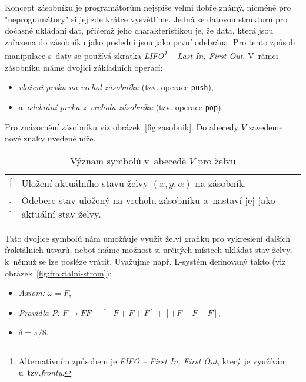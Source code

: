 Koncept zásobníku je programátorům nejspíše velmi dobře známý, nicméně pro "neprogramátory" si jej zde krátce vysvětlíme. Jedná se datovou strukturu pro dočasné ukládání dat, přičemž jeho charakteristikou je, že data, která jsou zařazena do zásobníku jako poslední jsou jako první odebrána. Pro tento způsob manipulace s~daty se používá zkratka \emph{LIFO\footnote{Alternativním způsobem je \emph{FIFO -- First In, First Out}, který je využíván u~tzv.\emph{fronty}.} -- Last In, First Out}. V~rámci zásobníku máme dvojici základních operací:
\begin{itemize}
    \item \emph{vložení prvku na vrchol zásobníku} (tzv. operace \texttt{push}),~
    \item a~\emph{odebrání prvku z~vrcholu zásobníku} (tzv. operace \texttt{pop}).
\end{itemize}
Pro znázornění zásobníku viz obrázek~\ref{fig:zasobnik}. Do abecedy $V$ zavedeme nové znaky uvedené níže. 
\begin{table}[H]
    \centering
    \begin{tabular}{lp{}}
        $[$ & Uložení aktuálního stavu želvy $(x,y,\alpha)$ na zásobník.\\
        $]$ & Odebere stav uložený na vrcholu zásobníku a~nastaví jej jako aktuální stav želvy.
    \end{tabular}
    \caption{Význam symbolů v~abecedě $V$ pro želvu}
    \label{table:vyznam-symbolu-zelva-zasobnik}
\end{table}
Tato dvojice symbolů nám umožňuje využít želví grafiku pro vykreslení dalších fraktálních útvarů, neboť máme možnost si určitých místech ukládat stav želvy, k~němuž se lze posléze vrátit. Uvažujme např. L-systém definovaný takto (viz obrázek~\ref{fig:fraktalni-strom}):
\begin{itemize}
    \item \emph{Axiom:} $\omega=F$,
    \item \emph{Pravidla $P$:} $F\to FF-[-F+F+F]+[+F-F-F]$,
    \item $\delta=\pi/8$.
\end{itemize}
\newpage
